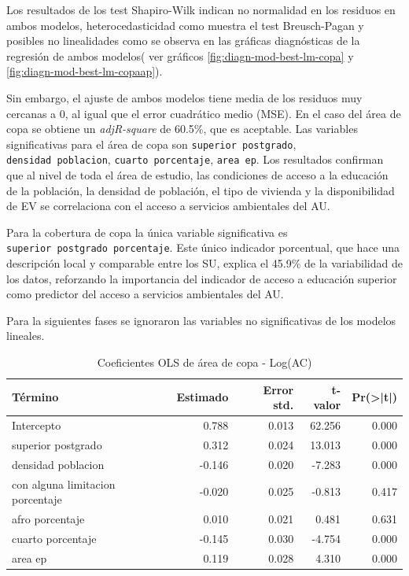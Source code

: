 \documentclass[12pt,a4paper,openany]{book}
\theoremstyle{definition}
\theoremstyle{definition}
\theoremstyle{definition}
\theoremstyle{remark}
\begin{document}
Los resultados de los test Shapiro-Wilk indican no normalidad en los
residuos en ambos modelos, heterocedasticidad como muestra el test
Breusch-Pagan y posibles no linealidades como se observa en las gráficas
diagnósticas de la regresión de ambos modelos( ver gráficos
\ref{fig:diagn-mod-best-lm-copa} y \ref{fig:diagn-mod-best-lm-copaap}).

Sin embargo, el ajuste de ambos modelos tiene media de los residuos muy
cercanas a 0, al igual que el error cuadrático medio (MSE). En el caso
del área de copa se obtiene un \emph{adjR-square} de 60.5\%, que es
aceptable. Las variables significativas para el área de copa son
\texttt{superior\ postgrado}, \texttt{densidad\ poblacion},
\texttt{cuarto\ porcentaje}, \texttt{area\ ep}. Los resultados confirman
que al nivel de toda el área de estudio, las condiciones de acceso a la
educación de la población, la densidad de población, el tipo de vivienda
y la disponibilidad de EV se correlaciona con el acceso a servicios
ambientales del AU.

Para la cobertura de copa la única variable significativa es
\texttt{superior\ postgrado\ porcentaje}. Este único indicador
porcentual, que hace una descripción local y comparable entre los SU,
explica el 45.9\% de la variabilidad de los datos, reforzando la
importancia del indicador de acceso a educación superior como predictor
del acceso a servicios ambientales del AU.

Para la siguientes fases se ignoraron las variables no significativas de
los modelos lineales.

\begin{table}[t]

\caption{\label{tab:coef-lm-copa}Coeficientes OLS de área de copa - Log(AC)}
\centering
\begin{tabular}{lrrrr}
\toprule
Término & Estimado & Error std. & t-valor & Pr(>|t|)\\
\midrule
Intercepto & 0.788 & 0.013 & 62.256 & 0.000\\
superior postgrado & 0.312 & 0.024 & 13.013 & 0.000\\
densidad poblacion & -0.146 & 0.020 & -7.283 & 0.000\\
con alguna limitacion porcentaje & -0.020 & 0.025 & -0.813 & 0.417\\
afro porcentaje & 0.010 & 0.021 & 0.481 & 0.631\\
\addlinespace
cuarto porcentaje & -0.145 & 0.030 & -4.754 & 0.000\\
area ep & 0.119 & 0.028 & 4.310 & 0.000\\
\bottomrule
\end{tabular}
\end{table}
\end{document}
